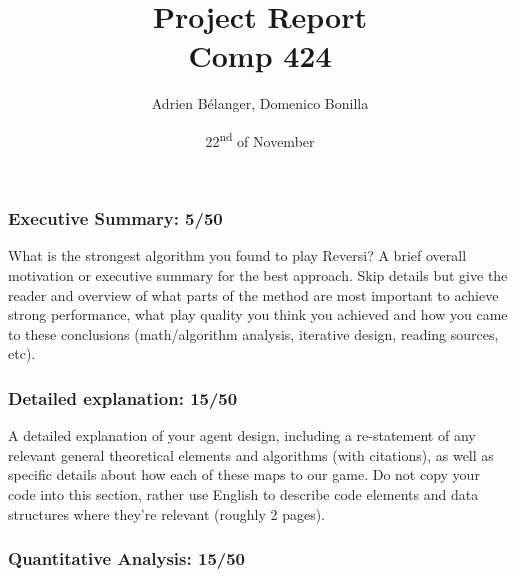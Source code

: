 \documentclass[12pt, letterpaper]{article}
\title{Project Report \\ \large Comp 424}
\author{Adrien Bélanger, Domenico Bonilla}
\date{22\textsuperscript{nd} of November}
\begin{document}
\maketitle

\subsubsection*{Executive Summary: 5/50}
    
    What is the strongest algorithm you found to play Reversi? 
    A brief overall motivation or executive summary for the best approach. 
    Skip details but give the reader and overview of what parts of 
    the method are most important to achieve strong performance, 
    what play quality you think you achieved and how you came to 
    these conclusions (math/algorithm analysis, iterative design, 
    reading sources, etc).
    



\subsubsection*{Detailed explanation: 15/50}
    
    A detailed explanation of your agent design, including a re-statement of any relevant general 
    theoretical elements and algorithms (with citations), as well as specific details about
    how each of these maps to our game. Do not copy your code into this section, 
    rather use English to describe code elements and data structures where they're 
    relevant  (roughly 2 pages).
    

\subsubsection*{Quantitative Analysis: 15/50}
    
\end{document}
